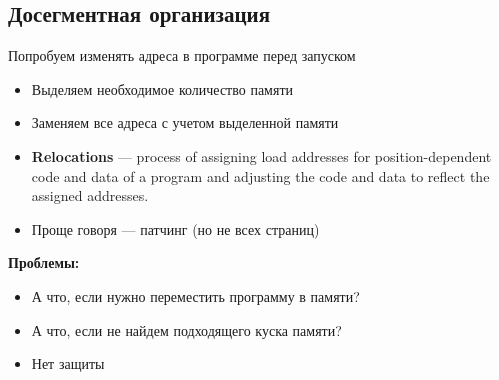 \documentclass[../../lectures.tex]{subfiles}
\begin{document}
\subsection{Досегментная организация}
Попробуем изменять адреса в программе перед запуском
\begin{itemize}
    \item Выделяем необходимое количество памяти
    \item Заменяем все адреса с учетом выделенной памяти
    \item \textbf{Relocations} --- process of assigning load addresses for position-dependent code and data of a program and adjusting the code and data to reflect the assigned addresses.
    \item Проще говоря --- патчинг (но не всех страниц)
\end{itemize}
\textbf{Проблемы:}
\begin{itemize}
    \item А что, если нужно переместить программу в памяти?
    \item А что, если не найдем подходящего куска памяти?
    \item Нет защиты
\end{itemize}
\end{document}
